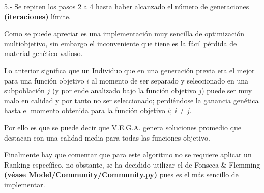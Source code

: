 \documentclass[letterpaper,10pt,english]{sphinxmanual}
\begin{document}
\begin{DUlineblock}{0em}
\item[] 5.- Se repiten los pasos 2 a 4 hasta haber alcanzado el número de generaciones \textbf{(iteraciones)} límite.
\item[] 
\item[] Como se puede apreciar es una implementación muy sencilla de optimización multiobjetivo,
sin embargo el inconveniente que tiene es la fácil pérdida de material genético valioso.
\item[] Lo anterior significa que un Individuo que en una generación previa era el mejor para una
función objetivo \(i\) al momento de ser separado y seleccionado en una subpoblación \(j\)
(y por ende analizado bajo la función objetivo \(j\)) puede ser muy malo en calidad y por tanto no ser seleccionado;
perdiéndose la ganancia genética hasta el momento obtenida para la función objetivo \(i;\ i \neq j\).
\item[] 
\item[] Por ello es que se puede decir que V.E.G.A. genera soluciones promedio que destacan con una calidad media
para todas las funciones objetivo.
\item[] 
\item[] Finalmente hay que comentar que para este algoritmo no se requiere aplicar un Ranking específico, no obstante,
se ha decidido utilizar el de Fonseca \& Flemming \textbf{(véase Model/Community/Community.py)} pues es el más sencillo
de implementar.
\end{DUlineblock}
\label{Model/MOEA/VEGA:module-Model.MOEA.VEGA}
\end{document}
